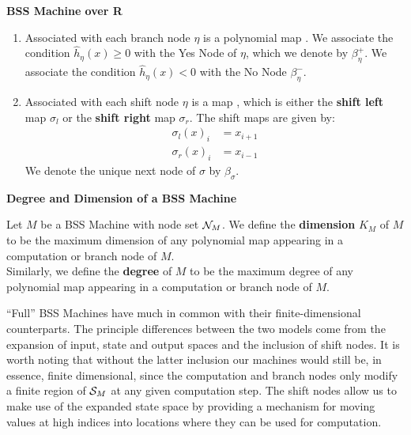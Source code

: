 \begin{definition}{\textbf{BSS Machine over R}}
\begin{enumerate}
    \item Associated with each branch node $\eta$ is a polynomial map
      .  We associate the
      condition $\widehat{h}_\eta(x) \geq 0$ with the Yes Node of
      $\eta$, which we denote by $\beta_\eta^+$.  We associate the
      condition $\widehat{h}_\eta(x) < 0$ with the No Node
      $\beta_\eta^-$.

    \item Associated with each shift node $\eta$ is a map
      , which is either the
      \textbf{shift left} map $\sigma_l$ or the \textbf{shift right}
      map $\sigma_r$.  The shift maps are given by:
      \begin{align*}
        \sigma_l(x)_i &= x_{i+1}\\
        \sigma_r(x)_i &= x_{i-1}
      \end{align*}
      We denote the unique next node of $\sigma$ by
      $\beta_\sigma$. 
    \end{enumerate}
  \end{definition}

  \begin{definition}{\textbf{Degree and Dimension of a BSS Machine}}
    
    Let $M$ be a BSS Machine with node set $\mathcal{N}_M$.  We define the
    \textbf{dimension} $K_M$ of $M$ to be the maximum dimension of any
    polynomial map appearing in a computation or branch node of $M$.\\
    
    Similarly, we define the \textbf{degree} of $M$ to be the maximum
    degree of any polynomial map appearing in a computation or branch
    node of $M$.
    
  \end{definition}

  ``Full'' BSS Machines have much in common with their
  finite-dimensional counterparts.  The principle differences between
  the two models come from the expansion of input, state and output
  spaces and the inclusion of shift nodes.  It is worth noting that
  without the latter inclusion our machines would still be, in
  essence, finite dimensional, since the computation and branch nodes
  only modify a finite region of $\mathcal{S}_M$ at any given
  computation step.  The shift nodes allow us to make use of the
  expanded state space by providing a mechanism for moving values at
  high indices into locations where they can be used for computation.

